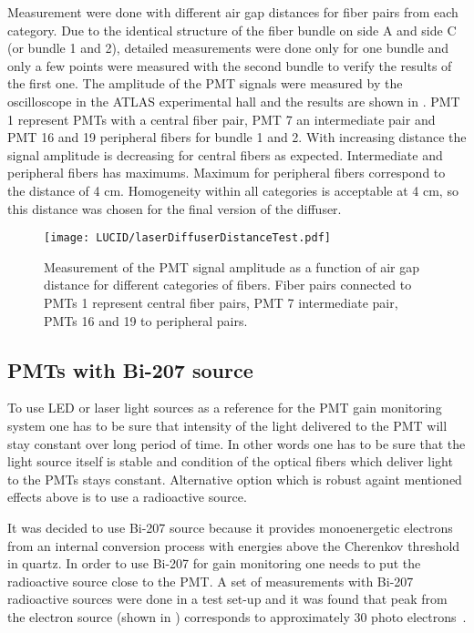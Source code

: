 Measurement were done with different air gap distances for fiber pairs from each category. 
Due to the identical structure of the fiber bundle on side A and side C (or bundle 1 and 2), detailed measurements
were done only for one bundle and only a few points were measured with the second bundle to verify the results of the first one. 
The amplitude of the PMT signals were measured by the oscilloscope in the ATLAS experimental hall
and the results are shown in . 
PMT 1 represent PMTs with a central fiber pair, PMT 7 an intermediate pair and PMT 16 and 19 peripheral fibers for bundle 1 and 2. 
With increasing distance the signal amplitude is decreasing for central fibers as expected. 
Intermediate and peripheral fibers has maximums. Maximum for peripheral fibers correspond to the distance of 4 cm.
Homogeneity within all categories is acceptable at 4 cm, so this distance was chosen for the final version of the diffuser.

\begin{figure}
\centering
\texttt{[image: LUCID/laserDiffuserDistanceTest.pdf]}
\caption{Measurement of the PMT signal amplitude as a function of air gap distance for different categories of fibers. Fiber pairs connected to PMTs 1 represent 
central fiber pairs, PMT 7 intermediate pair, PMTs 16 and 19 to peripheral pairs.}
\label{fig:laserDiffuserDistanceTest}
\end{figure}

\subsection{PMTs with Bi-207 source}
\label{subsec:bi207Calibration}

To use LED or laser light sources as a reference for the PMT gain monitoring system one has to be sure that intensity of the light delivered to the PMT 
will stay constant over long period of time. In other words one has to be sure that the light source itself is stable and condition of 
the optical fibers which deliver light to the PMTs stays constant.
Alternative option which is robust againt mentioned effects above is to use a radioactive source.

It was decided to use Bi-207 source because it provides monoenergetic electrons from an internal conversion process 
with energies above the Cherenkov threshold in quartz.
In order to use Bi-207 for gain monitoring one needs to put the radioactive source close to the PMT.
A set of measurements with Bi-207 radioactive sources were done in a test set-up and it was found that peak from the electron source 
(shown in ) corresponds to approximately 30 photo electrons~\cite{Alberghi:2016tad}.

